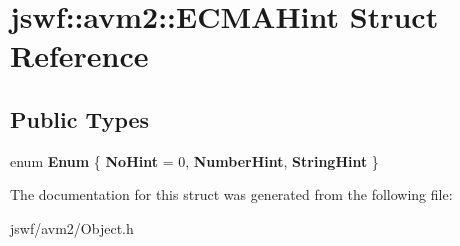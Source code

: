 \hypertarget{structjswf_1_1avm2_1_1_e_c_m_a_hint}{\section{jswf\+:\+:avm2\+:\+:E\+C\+M\+A\+Hint Struct Reference}
\label{structjswf_1_1avm2_1_1_e_c_m_a_hint}
}
\subsection*{Public Types}
\begin{DoxyCompactItemize}
\item 
\hypertarget{structjswf_1_1avm2_1_1_e_c_m_a_hint_a7f858509585153bc8e03cd355edaf22f}{enum {\bfseries Enum} \{ {\bfseries No\+Hint} = 0, 
{\bfseries Number\+Hint}, 
{\bfseries String\+Hint}
 \}}\label{structjswf_1_1avm2_1_1_e_c_m_a_hint_a7f858509585153bc8e03cd355edaf22f}

\end{DoxyCompactItemize}


The documentation for this struct was generated from the following file\+:\begin{DoxyCompactItemize}
\item 
jswf/avm2/Object.\+h\end{DoxyCompactItemize}

